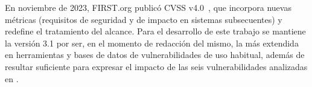 En noviembre de 2023, FIRST.org publicó CVSS
v4.0~, que incorpora nuevas métricas (requisitos de seguridad y de impacto en sistemas subsecuentes) y redefine el
tratamiento del alcance. Para el desarrollo de este trabajo se mantiene la versión 3.1
por ser, en el momento de redacción del mismo, la más extendida en herramientas y
bases de datos de vulnerabilidades de uso habitual, además de
resultar suficiente para expresar el impacto de las seis vulnerabilidades
analizadas en \breachlab.

